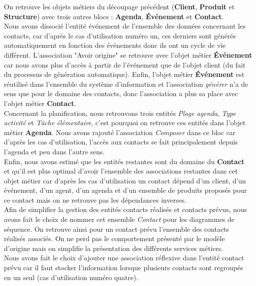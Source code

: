 On retrouve les objets métiers du découpage précédent (\textbf{Client}, \textbf{Produit} et \textbf{Structure}) avec trois autres blocs : \textbf{Agenda}, \textbf{Événement} et \textbf{Contact}. \\

Nous avons dissocié l'entité événement de l'ensemble des données concernant les contacts, car d'après le cas d'utilisation numéro un, ces derniers sont générés automatiquement en fonction des événements donc ils ont un cycle de vie différent. L'association "Avoir origine" se retrouve avec l'objet métier \textbf{Événement} car nous avons plus d'accès à partir de l'événement que de l'objet client (du fait du processus de génération automatique). Enfin, l'objet métier \textbf{Événement} est réutilisé dans l'ensemble du système d'information et l'association \textit{générer} n'a de sens que pour le domaine des contacts, donc l'association a plus sa place avec l'objet métier \textbf{Contact}. \\

Concernant la planification, nous retrouvons trois entités \textit{Plage agenda}, \textit{Type activité} et \textit{Tâche élémentaire}, c'est pourquoi on retrouve ces entités dans l'objet métier \textbf{Agenda}. Nous avons rajouté l'association \textit{Composer} dans ce bloc car d'après les cas d'utilisation, l'accès aux contacts se fait principalement depuis l'agenda et peu dans l'autre sens. \\

Enfin, nous avons estimé que les entités restantes sont du domaine du \textbf{Contact} et qu'il est plus optimal d'avoir l'ensemble des associations restantes dans cet objet métier car d'après les cas d'utilisation un contact dépend d'un client, d'un événement, d'un agent, d'un agenda et d'un ensemble de produits proposés pour ce contact mais on ne retrouve pas les dépendances inverses. \\

Afin de simplifier la gestion des entités contacts réalisés et contacts prévus, nous avons fait le choix de nommer cet ensemble \textit{Contact} pour les diagrammes de séquence. On retrouve ainsi pour un contact prévu l'ensemble des contacts réalisés associés. On ne perd pas le comportement présenté par le modèle d'origine mais on simplifie la présentation des différents services métiers. \\

Nous avons fait le choix d'ajouter une association réflexive dans l'entité contact prévu car il faut stocker l'information lorsque plusieurs contacts sont regroupés en un seul (cas d'utilisation numéro quatre). \\

